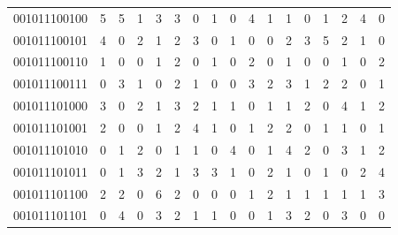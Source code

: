\documentclass[10pt,a4paper]{article}
\begin{document}
\begin{longtable}{ |c|c|c|c|c|c|c|c|c|c|c|c|c|c|c|c|c| }
    001011100100              & 5                            & 5                                & 1                            & 3                              & 3   & 0   & 1   & 0   & 4   & 1   & 1   & 0   & 1   & 2   & 4   & 0   \\
    001011100101              & 4                            & 0                                & 2                            & 1                              & 2   & 3   & 0   & 1   & 0   & 0   & 2   & 3   & 5   & 2   & 1   & 0   \\
    001011100110              & 1                            & 0                                & 0                            & 1                              & 2   & 0   & 1   & 0   & 2   & 0   & 1   & 0   & 0   & 1   & 0   & 2   \\
    001011100111              & 0                            & 3                                & 1                            & 0                              & 2   & 1   & 0   & 0   & 3   & 2   & 3   & 1   & 2   & 2   & 0   & 1   \\
    001011101000              & 3                            & 0                                & 2                            & 1                              & 3   & 2   & 1   & 1   & 0   & 1   & 1   & 2   & 0   & 4   & 1   & 2   \\
    001011101001              & 2                            & 0                                & 0                            & 1                              & 2   & 4   & 1   & 0   & 1   & 2   & 2   & 0   & 1   & 1   & 0   & 1   \\
    001011101010              & 0                            & 1                                & 2                            & 0                              & 1   & 1   & 0   & 4   & 0   & 1   & 4   & 2   & 0   & 3   & 1   & 2   \\
    001011101011              & 0                            & 1                                & 3                            & 2                              & 1   & 3   & 3   & 1   & 0   & 2   & 1   & 0   & 1   & 0   & 2   & 4   \\
    001011101100              & 2                            & 2                                & 0                            & 6                              & 2   & 0   & 0   & 0   & 1   & 2   & 1   & 1   & 1   & 1   & 1   & 3   \\
    001011101101              & 0                            & 4                                & 0                            & 3                              & 2   & 1   & 1   & 0   & 0   & 1   & 3   & 2   & 0   & 3   & 0   & 0   \\

\end{longtable}
\end{document}
